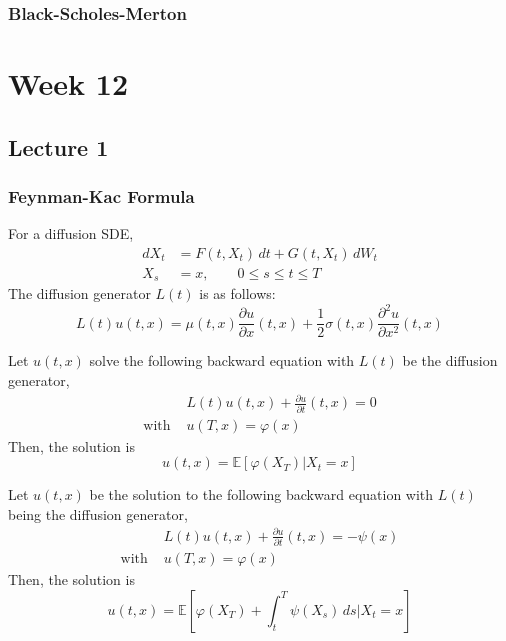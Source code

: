 \documentclass[12pt,a4paper]{article}
\newcommand{\E}{\mathbb{E}}
\begin{document}
    \subsubsection{Black-Scholes-Merton}
    \pagebreak
    \section{Week 12}
    \subsection{Lecture 1}
    \subsubsection{Feynman-Kac Formula}
    For a diffusion SDE, 
    \begin{align*}
        dX_t &= F(t,X_t) \, dt + G(t,X_t)\, dW_t\\
        X_s &= x,\qquad 0\le s\le t\le T
    \end{align*}
    The diffusion generator $L(t)$ is as follows:
    \begin{equation*}
        L(t)u(t,x) = \mu(t, x) \frac{\partial u}{\partial x}(t,x) + \frac{1}{2}\sigma(t,x)\frac{\partial^2 u}{\partial x^2}(t,x)
    \end{equation*}
    \begin{theorem}{}{}
        Let $u(t,x)$ solve the following backward equation with $L(t)$ be the diffusion generator,
        \begin{align*}
             &L(t)u(t,x) + \frac{\partial u}{\partial t} (t,x) = 0\\
             \text{with } & u(T,x) = \varphi(x)
        \end{align*}
        Then, the solution is
        \begin{equation*}
            u(t,x) = \E[\varphi(X_T)|X_t=x]
        \end{equation*}
    \end{theorem}
    \begin{theorem}{}{}
        Let $u(t,x)$ be the solution to the following backward equation with $L(t)$ being the diffusion generator,
        \begin{align*}
             &L(t)u(t,x) + \frac{\partial u}{\partial t} (t,x) = -\psi(x)\\
             \text{with } & u(T,x) = \varphi(x)
        \end{align*}
        Then, the solution is
        \begin{equation*}
            u(t,x) = \E\left[\varphi(X_T)+\int_t^T \psi(X_s)\, ds\bigg|X_t=x\right]
        \end{equation*}
    \end{theorem}
\end{document}
